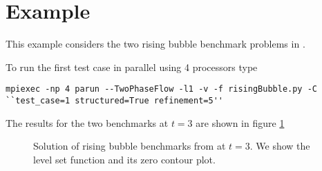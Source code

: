 \documentclass[english,11pt]{article}
\let\cite=\citet
\begin{document}
\section{Example}
This example considers the two rising bubble benchmark problems in \cite{hysing2009quantitative}. 



\vspace{2ex}
To run the first test case in parallel using 4 processors type 

\begin{lstlisting}[frame=single]
  mpiexec -np 4 parun --TwoPhaseFlow -l1 -v -f risingBubble.py -C ``test_case=1 structured=True refinement=5''
\end{lstlisting}

The results for the two benchmarks at $t=3$ are shown in figure \ref{fig:rising_bubble} 

\begin{figure}[h]
  \centering
   \qquad \qquad \qquad
  \caption{Solution of rising bubble benchmarks from \cite{hysing2009quantitative} at $t=3$.
  We show the level set function and its zero contour plot.}
  \label{fig:rising_bubble}
\end{figure}


%
%

\end{document}

